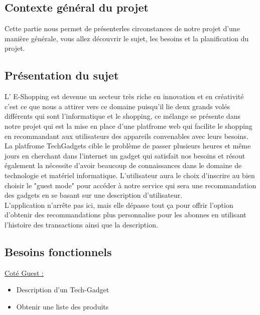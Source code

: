 


\begin{center}

\chapter{ Contexte général du projet} 
	
\end{center}

Cette partie nous permet de présenterles circonstances de notre projet d’une manière générale, vous allez découvrir le sujet, les besoins et la planification du projet.\\ 


\section{Présentation du sujet}

L' E-Shopping est devenue un secteur très riche en innovation et en créativité c’est ce que nous a attirer vers ce domaine puisqu’il lie deux grands volés différents qui sont l’informatique et le shopping, ce mélange se présente dans notre projet qui est la mise en place d’une platfrome web qui facilite le shopping en recommandant aux utilisateurs des appareils convenables avec leurs besoins.\\

La platfrome TechGadgets cible le problème de passer plusieurs heures et même jours en cherchant dans l'internet un gadget qui satisfait nos besoins et résout également la nécessite d'avoir beaucoup de connaissances dans le domaine de technologie et matériel informatique. L'utilisateur aura le choix d'inscrire au bien choisir le "guest mode" pour accéder à notre service qui sera une recommandation des gadgets en se basant sur une description d'utilisateur. \\

L’application n’arrête pas ici, mais elle dépasse tout ça pour offrir l’option d'obtenir des recommandations plus personnalise pour les abonnes en utilisant l'histoire des transactions ainsi que la description.

\section{Besoins fonctionnels}

\underline {Coté Guest : }
\\
\begin{itemize}
  \item Description d'un Tech-Gadget
  \item Obtenir une liste des produits \\
\end{itemize}

